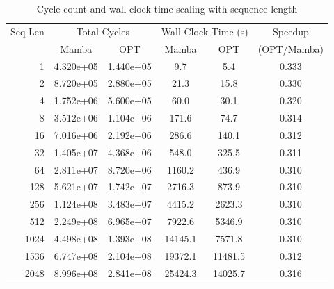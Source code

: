 \begin{table}[h]\centering
    \caption{Cycle-count and wall-clock time scaling with sequence length}
    \label{tab:seq_scaling}
    \begin{tabular}{r cc cc c}\hline
        Seq Len & \multicolumn{2}{c}{Total Cycles} & \multicolumn{2}{c}{Wall-Clock Time (s)} & Speedup \\
            & Mamba & OPT & Mamba & OPT & (OPT/Mamba) \\\hline
        1 & 4.320e+05 & 1.440e+05 & 9.7 & 5.4 & 0.333 \\
        2 & 8.720e+05 & 2.880e+05 & 21.3 & 15.8 & 0.330 \\
        4 & 1.752e+06 & 5.600e+05 & 60.0 & 30.1 & 0.320 \\
        8 & 3.512e+06 & 1.104e+06 & 171.6 & 74.7 & 0.314 \\
       16 & 7.016e+06 & 2.192e+06 & 286.6 & 140.1 & 0.312 \\
       32 & 1.405e+07 & 4.368e+06 & 548.0 & 325.5 & 0.311 \\
       64 & 2.811e+07 & 8.720e+06 & 1160.2 & 436.9 & 0.310 \\
      128 & 5.621e+07 & 1.742e+07 & 2716.3 & 873.9 & 0.310 \\
      256 & 1.124e+08 & 3.483e+07 & 4415.2 & 2623.3 & 0.310 \\
      512 & 2.249e+08 & 6.965e+07 & 7922.6 & 5346.9 & 0.310 \\
     1024 & 4.498e+08 & 1.393e+08 & 14145.1 & 7571.8 & 0.310 \\
     1536 & 6.747e+08 & 2.104e+08 & 19372.1 & 11481.5 & 0.312 \\
     2048 & 8.996e+08 & 2.841e+08 & 25424.3 & 14025.7 & 0.316 \\
\hline\end{tabular}\end{table}